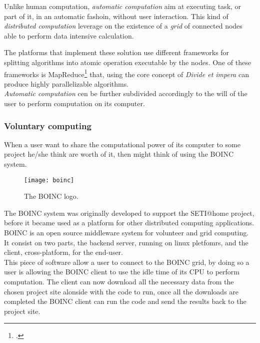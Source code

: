 Unlike human computation, \emph{automatic computation} aim at executing task, or
part of it, in an automatic fashoin, without user interaction. This kind of
\emph{distributed computation} leverage on the existence of a \emph{grid} of
connected nodes able to perform data intensive calculation.

The platforms that implement these solution use different frameworks for splitting
algorithms into atomic operation executable by the nodes. One of these frameworks
is MapReduce\footcite{dean2008mapreduce} that, using the core concept of
\emph{Divide et impera} can produce highly parallelizable algorithms.\\

\emph{Automatic computation} cen be further subdivided accordingly to the will
of the user to perform computation on its computer.

\subsubsection{Voluntary computing}
\label{sec:bg:crowd:auto:voluntary}

When a user want to share the computational power of its computer to some
project he/she think are worth of it, then might think of using the \ac{BOINC}
system.\\

\begin{figure}[htb]
    \centering
    \texttt{[image: boinc]}
    \caption{The \acs{BOINC} logo.}
    \label{fig:boinc}
\end{figure}
The \ac{BOINC} system was originally developed to support the \ac{SETI@home}
project, before it became used as a platform for other distributed computing
applications. \ac{BOINC} is an open source middleware system for volunteer
and grid computing. It consist on two parts, the backend server, running on
linux pletfomrs, and the client, cross-platform, for the end-user.\\

This piece of software allow a user to connect to the \ac{BOINC} grid, by doing
so a user is allowing the \ac{BOINC} client to use the idle time of its CPU to
perform computation. The client can now  download all the necessary data from the
chosen project site alonside with the code to run, once all the downloads are
completed the \ac{BOINC} client can run the code and send the results back to
the project site.\\


